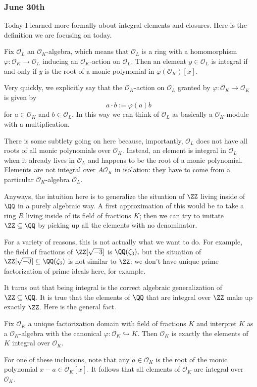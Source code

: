 \subsubsection{June 30th}
Today I learned more formally about integral elements and closures. Here is the definition we are focusing on today.
\begin{definition}
    Fix $\mathcal O_L$ an $\mathcal O_K$-algebra, which means that $\mathcal O_L$ is a ring with a homomorphism $\varphi:\mathcal O_K\to\mathcal O_L$ inducing an $\mathcal O_K$-action on $\mathcal O_L.$ Then an element $y\in\mathcal O_L$ is integral if and only if $y$ is the root of a monic polynomial in $\varphi(\mathcal O_K)[x].$
\end{definition}
Very quickly, we explicitly say that the $\mathcal O_K$-action on $\mathcal O_L$ granted by $\varphi:\mathcal O_K\to\mathcal O_K$ is given by
\[a\cdot b:=\varphi(a)b\]
for $a\in\mathcal O_K$ and $b\in\mathcal O_L.$ In this way we can think of $\mathcal O_L$ as basically a $\mathcal O_K$-module with a multiplication.

There is some subtlety going on here because, importantly, $\mathcal O_L$ does not have all roots of all monic polynomials over $\mathcal O_K.$ Instead, an element is integral in $\mathcal O_L$ when it already lives in $\mathcal O_L$ and happens to be the root of a monic polynomial. Elements are not integral over $A\mathcal O_K$ in isolation: they have to come from a particular $\mathcal O_K$-algebra $\mathcal O_L.$

Anyways, the intuition here is to generalize the situation of $\ZZ$ living inside of $\QQ$ in a purely algebraic way. A first approximation of this would be to take a ring $R$ living inside of its field of fractions $K$; then we can try to imitate $\ZZ\subseteq\QQ$ by picking up all the elements with no denominator.

For a variety of reasons, this is not actually what we want to do. For example, the field of fractions of $\ZZ[\sqrt{-3}]$ is $\QQ(\zeta_3),$ but the situation of $\ZZ[\sqrt{-3}]\subseteq\QQ(\zeta_3)$ is not similar to $\ZZ$: we don't have unique prime factorization of prime ideals here, for example.

It turns out that being integral is the correct algebraic generalization of $\ZZ\subseteq\QQ.$ It is true that the elements of $\QQ$ that are integral over $\ZZ$ make up exactly $\ZZ.$ Here is the general fact.
\begin{proposition}
    Fix $\mathcal O_K$ a unique factorization domain with field of fractions $K$ and interpret $K$ as a $\mathcal O_K$-algebra with the canonical $\varphi:\mathcal O_K\hookrightarrow K.$ Then $\mathcal O_K$ is exactly the elements of $K$ integral over $\mathcal O_K.$
\end{proposition}
For one of these inclusions, note that any $a\in\mathcal O_K$ is the root of the monic polynomial $x-a\in\mathcal O_K[x].$ It follows that all elements of $\mathcal O_K$ are integral over $\mathcal O_K.$

